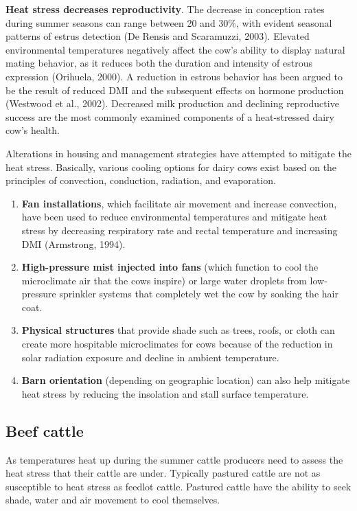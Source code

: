 \documentclass[]{book}
\begin{document}
\textbf{Heat stress decreases reproductivity}. The decrease in
conception rates during summer seasons can range between 20 and 30\%,
with evident seasonal patterns of estrus detection (De Rensis and
Scaramuzzi, 2003). Elevated environmental temperatures negatively affect
the cow's ability to display natural mating behavior, as it reduces both
the duration and intensity of estrous expression (Orihuela, 2000). A
reduction in estrous behavior has been argued to be the result of
reduced DMI and the subsequent effects on hormone production (Westwood
et al., 2002). Decreased milk production and declining reproductive
success are the most commonly examined components of a heat-stressed
dairy cow's health.

Alterations in housing and management strategies have attempted to
mitigate the heat stress. Basically, various cooling options for dairy
cows exist based on the principles of convection, conduction, radiation,
and evaporation.

\begin{enumerate}
\def\labelenumi{\arabic{enumi}.}
\item
  \textbf{Fan installations}, which facilitate air movement and increase
  convection, have been used to reduce environmental temperatures and
  mitigate heat stress by decreasing respiratory rate and rectal
  temperature and increasing DMI (Armstrong, 1994).
\item
  \textbf{High-pressure mist injected into fans} (which function to cool
  the microclimate air that the cows inspire) or large water droplets
  from low-pressure sprinkler systems that completely wet the cow by
  soaking the hair coat.
\item
  \textbf{Physical structures} that provide shade such as trees, roofs,
  or cloth can create more hospitable microclimates for cows because of
  the reduction in solar radiation exposure and decline in ambient
  temperature.
\item
  \textbf{Barn orientation} (depending on geographic location) can also
  help mitigate heat stress by reducing the insolation and stall surface
  temperature.
\end{enumerate}

\subsection{Beef cattle}\label{beef-cattle}

As temperatures heat up during the summer cattle producers need to
assess the heat stress that their cattle are under. Typically pastured
cattle are not as susceptible to heat stress as feedlot cattle. Pastured
cattle have the ability to seek shade, water and air movement to cool
themselves.
\end{document}
